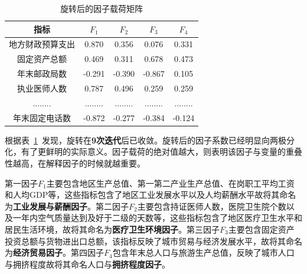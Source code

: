 \documentclass{whutmod}
\begin{document}
			\begin{table}[H]
			\centering
			\caption{旋转后的因子载荷矩阵}\label{xuanzhuanhuo}
			\begin{tabular}{ccccc}
				\toprule[2pt]
				\multicolumn{1}{m{2cm}}{\centering 指标} &
				\multicolumn{1}{m{1cm}}{\centering $F_{1}$} & \multicolumn{1}{m{1cm}}{\centering $F_{2}$} & \multicolumn{1}{m{1cm}}{\centering $F_{3}$}&
				\multicolumn{1}{m{1cm}}{\centering $F_{4}$}\\
				\midrule[1pt]
				地方财政预算支出&0.870	 & 0.356 & 0.076&0.331\\ 
				固定资产总额&0.469 & 0.311 &0.678&0.473\\ 
				年末邮政局数&-0.291 & -0.390  &-0.867&0.105\\ 
				执业医师人数&0.787 &0.496   &0.259 &0.259\\ 
				........& ........&  ........ &........ &........ \\ 
				年末固定电话数&-0.872 &-0.277   &-0.384 &-0.124 \\
				\bottomrule[2pt]
			\end{tabular}
		\end{table}
	
	根据表~\ref{xuanzhuanhuo}~发现，旋转在\textbf{9次迭代}后已收敛。旋转后的因子系数已经明显向两极分化，有了更鲜明的实际意义。因子载荷的绝对值越大，则表明该因子与变量的重叠性越高，在解释因子的时候就越重要。

		第一因子$F_{1}$主要包含地区生产总值、第一第二产业生产总值、在岗职工平均工资和人均GDP等，这些指标包含了地区工业发展水平以及人均薪酬水平故将其命名为\textbf{工业发展与薪酬因子}。第二因子$F_{2}$主要包含持证医师人数，医院卫生院个数以及一年内空气质量达到及好于二级的天数等，这些指标包含了地区医疗卫生水平和居民生活环境，故将其命名为\textbf{医疗卫生环境因子}。第三因子$F_{3}$主要包含固定资产投资总额与货物进出口总额，该指标反映了城市贸易与经济发展水平，故将其命名为\textbf{经济贸易因子}。第四因子$F_{4}$包含年末总人口与旅游生产总值，反映了城市人口与拥挤程度故将其命名人口与\textbf{拥挤程度因子}。
\end{document}
